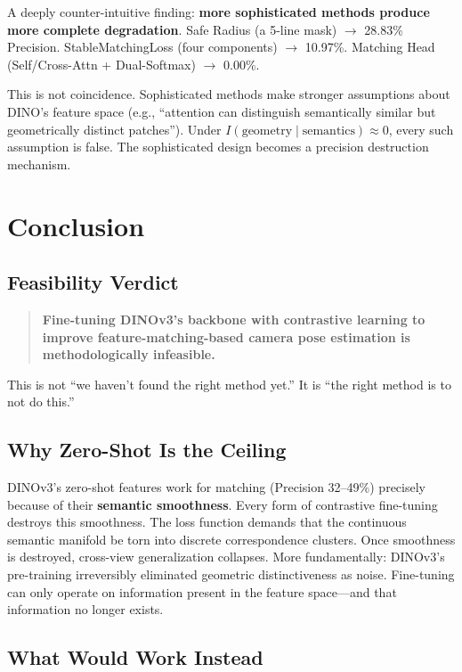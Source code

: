 \documentclass[11pt,a4paper]{article}
\begin{document}
A deeply counter-intuitive finding: \textbf{more sophisticated methods produce more complete degradation}. Safe Radius (a 5-line mask) $\rightarrow$ 28.83\% Precision. StableMatchingLoss (four components) $\rightarrow$ 10.97\%. Matching Head (Self/Cross-Attn + Dual-Softmax) $\rightarrow$ 0.00\%.

This is not coincidence. Sophisticated methods make stronger assumptions about DINO's feature space (e.g., ``attention can distinguish semantically similar but geometrically distinct patches''). Under $I(\text{geometry} \mid \text{semantics}) \approx 0$, every such assumption is false. The sophisticated design becomes a precision destruction mechanism.

\section{Conclusion}

\subsection{Feasibility Verdict}

\begin{quote}
\bfseries\large
Fine-tuning DINOv3's backbone with contrastive learning to improve feature-matching-based camera pose estimation is \textbf{methodologically infeasible}.
\end{quote}

This is not ``we haven't found the right method yet.'' It is ``the right method is to not do this.''

\subsection{Why Zero-Shot Is the Ceiling}

DINOv3's zero-shot features work for matching (Precision 32--49\%) precisely because of their \textbf{semantic smoothness}. Every form of contrastive fine-tuning destroys this smoothness. The loss function demands that the continuous semantic manifold be torn into discrete correspondence clusters. Once smoothness is destroyed, cross-view generalization collapses. More fundamentally: DINOv3's pre-training irreversibly eliminated geometric distinctiveness as noise. Fine-tuning can only operate on information present in the feature space---and that information no longer exists.

\subsection{What Would Work Instead}
\end{document}

